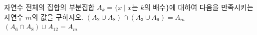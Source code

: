 자연수 전체의 집합의 부분집합 $A_k=\{x \mid x$는 $k$의 배수$\}$에 대하여 다음을 만족시키는 자연수 $m$의 값을 구하시오. 
 $(A_2\cup A_8)\cap(A_3\cup A_9)=A_m$
 $(A_6\cap A_8)\cup A_{12}=A_m$
